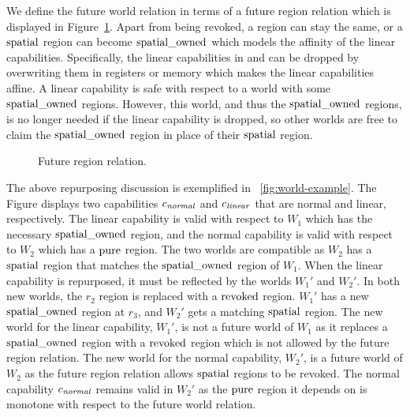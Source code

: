 \begin{jversion}
We define the future world relation in terms of a future region relation which is displayed in Figure~\ref{fig:ft-reg-rel}.
Apart from being revoked, a region can stay the same, or a $\mathrm{spatial}$ region can become $\mathrm{spatial\_owned}$ which models the affinity of the linear capabilities.
Specifically, the linear capabilities in \trgcm{} and \srccm{} can be dropped by overwriting them in registers or memory which makes the linear capabilities affine.
A linear capability is safe with respect to a world with some $\mathrm{spatial\_owned}$ regions.
However, this world, and thus the $\mathrm{spatial\_owned}$ regions, is no longer needed if the linear capability is dropped, so other worlds are free to claim the $\mathrm{spatial\_owned}$ region in place of their $\mathrm{spatial}$ region.
\begin{figure}[htb]
  \centering
  \caption{Future region relation.}
  \label{fig:ft-reg-rel}
\end{figure}
The above repurposing discussion is exemplified in \figurename~\ref{fig:world-example}.
The Figure displays two capabilities $c_{\mathit{normal}}$ and $c_{\mathit{linear}}$ that are normal and linear, respectively.
The linear capability is valid with respect to $W_1$ which has the necessary $\mathrm{spatial\_owned}$ region, and the normal capability is valid with respect to $W_2$ which has a $\mathrm{pure}$ region.
The two worlds are compatible as $W_2$ has a $\mathrm{spatial}$ region that matches the $\mathrm{spatial\_owned}$ region of $W_1$.
When the linear capability is repurposed, it must be reflected by the worlds $W_1'$ and $W_2'$.
In both new worlds, the $r_2$ region is replaced with a $\mathrm{revoked}$ region.
$W_1'$ has a new $\mathrm{spatial\_owned}$ region at $r_3$, and $W_2'$ gets a matching $\mathrm{spatial}$ region.
The new world for the linear capability, $W_1'$, is not a future world of $W_1$ as it replaces a $\mathrm{spatial\_owned}$ region with a $\mathrm{revoked}$ region which is not allowed by the future region relation.
The new world for the normal capability, $W_2'$, is a future world of $W_2$ as the future region relation allows $\mathrm{spatial}$ regions to be revoked.
The normal capability $c_{\mathit{normal}}$ remains valid in $W_2'$ as the $\mathrm{pure}$ region it depends on is monotone with respect to the future world relation.
\begin{figure}\centering
  

\end{figure}
\end{jversion}
